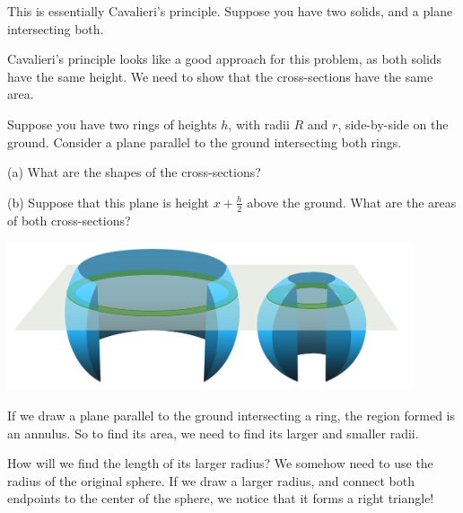 \documentclass[11pt,paper=letter]{scrartcl}
\begin{document}
This is essentially Cavalieri's principle. Suppose you have two solids, and a plane intersecting both. 

Cavalieri's principle looks like a good approach for this problem, as both solids have the same height. We need to show that the cross-sections have the same area.

\begin{exboxed}
  Suppose you have two rings of heights $h$, with radii $R$ and $r$, side-by-side on the ground. Consider a plane parallel to the ground intersecting both rings.
    \begin{enumthin}
      \item[(a)] What are the shapes of the cross-sections?
      \item[(b)] Suppose that this plane is height $x + \frac h2$ above the ground. What are the areas of both cross-sections? \hints{\ref{h:np01} \ref{h:bf11}}
    \end{enumthin}
\end{exboxed}

\begin{center}
  \includegraphics[width=12cm]{napkin-ring-2.png}
\end{center}

If we draw a plane parallel to the ground intersecting a ring, the region formed is an annulus. So to find its area, we need to find its larger and smaller radii.

How will we find the length of its larger radius? We somehow need to use the radius of the original sphere. If we draw a larger radius, and connect both endpoints to the center of the sphere, we notice that it forms a right triangle!
\end{document}
